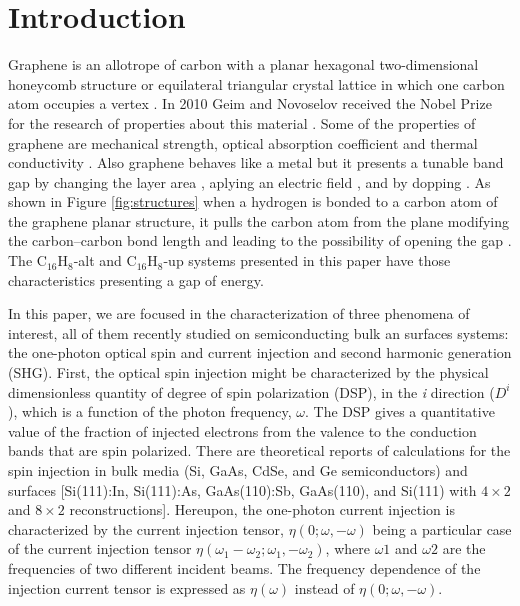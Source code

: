 \documentclass[aps,pra,11pt,tightenlines,showpacs,superscriptaddress,groupedaddress]{revtex4-1}
\newcommand{\altstc}{C$_{16}$H$_{8}$-alt}
\newcommand{\upstc}{C$_{16}$H$_{8}$-up}
\begin{document}

\section{Introduction}\label{sec:intro}


Graphene is an allotrope of carbon with a planar hexagonal two-dimensional
honeycomb structure or equilateral triangular crystal lattice in which one
carbon atom occupies a vertex \cite{geim2007rise}. In 2010 Geim and Novoselov
received the Nobel Prize for the research of properties about this material
\cite{geim2007rise}. Some of the properties of graphene are mechanical
strength, optical absorption coefficient and thermal conductivity
\cite{geim2007rise, nair2008fine}. Also graphene behaves like a metal
\cite{geim2007rise} but it presents a tunable band gap by changing the layer
area \cite{han2007energy}, aplying an electric field \cite{zhang2009direct},
and by dopping \cite{ohta2006controlling,
elias2009control,guisinger2009exposure,samarakoon2010tunable}. As shown in
Figure \ref{fig:structures} when a hydrogen is bonded to a carbon atom of the
graphene planar structure, it pulls the carbon atom from the plane modifying the 
carbon--carbon bond length and leading to the possibility of opening the gap
\cite{samarakoon2010tunable}. The {\altstc} and {\upstc} systems presented in 
this paper have those characteristics presenting a gap of energy.


In this paper, we are focused in the characterization of three phenomena of
interest, all of them recently studied on semiconducting bulk an surfaces
systems: the one-photon optical spin and current injection and  second
harmonic generation (SHG). First, the optical spin injection might be
characterized by the physical dimensionless quantity of degree of spin
polarization (DSP), in the \emph{i} direction ($D^{i}$), which is a function of
the photon frequency, $\omega$. The DSP gives a quantitative value of the
fraction of injected electrons from the valence to the conduction bands that
are spin polarized. There are theoretical reports of calculations for the spin
injection in bulk media  (Si, GaAs, CdSe, and Ge semiconductors)
\cite{nastos2007full,cabellos2009stress,rioux2010optical} and surfaces
[Si(111):In, Si(111):As, GaAs(110):Sb, GaAs(110), and Si(111) with $4\times2$
and $8\times2$ reconstructions]\cite{mendoza2012optical,arzate2014optical}.
Hereupon, the one-photon current injection is characterized by the current
injection tensor, $\eta(0;\omega,-\omega)$  being a particular case of the
current injection tensor $\eta(\omega_{1}-\omega_{2};\omega_{1},-\omega_{2})$,
where $\omega{1}$ and $\omega{2}$ are the frequencies of two different incident
beams. The frequency dependence of the injection current tensor is expressed as
$\eta(\omega)$ instead of $\eta(0;\omega,-\omega)$.
\end{document}
